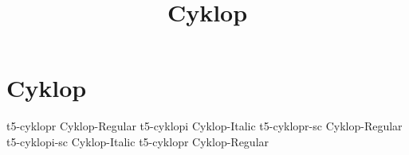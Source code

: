 \documentclass[sample]{vnsample}
\title{Cyklop}
\begin{document}
\section{Cyklop}
    {t5-cyklopr}    {Cyklop-Regular}
   {t5-cyklopi}    {Cyklop-Italic}
   {t5-cyklopr-sc} {Cyklop-Regular}
 {t5-cyklopi-sc} {Cyklop-Italic}
    {t5-cyklopr}    {Cyklop-Regular}
\end{document}
